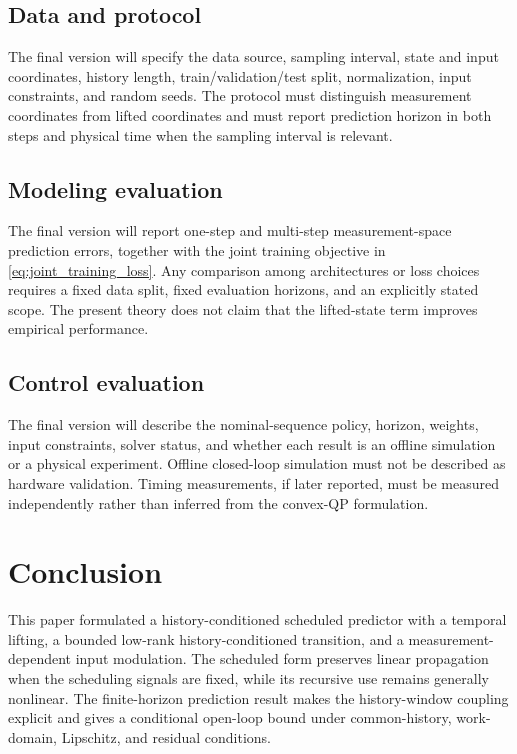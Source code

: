 \documentclass[journal]{IEEEtran}
\begin{document}
\subsection{Data and protocol}

The final version will specify the data source, sampling interval, state and input coordinates, history length, train/validation/test split, normalization, input constraints, and random seeds. The protocol must distinguish measurement coordinates from lifted coordinates and must report prediction horizon in both steps and physical time when the sampling interval is relevant.

\subsection{Modeling evaluation}

The final version will report one-step and multi-step measurement-space prediction errors, together with the joint training objective in \eqref{eq:joint_training_loss}. Any comparison among architectures or loss choices requires a fixed data split, fixed evaluation horizons, and an explicitly stated scope. The present theory does not claim that the lifted-state term improves empirical performance.

\subsection{Control evaluation}

The final version will describe the nominal-sequence policy, horizon, weights, input constraints, solver status, and whether each result is an offline simulation or a physical experiment. Offline closed-loop simulation must not be described as hardware validation. Timing measurements, if later reported, must be measured independently rather than inferred from the convex-QP formulation.

\section{Conclusion}
\label{sec:conclusion}

This paper formulated a history-conditioned scheduled predictor with a temporal lifting, a bounded low-rank history-conditioned transition, and a measurement-dependent input modulation. The scheduled form preserves linear propagation when the scheduling signals are fixed, while its recursive use remains generally nonlinear. The finite-horizon prediction result makes the history-window coupling explicit and gives a conditional open-loop bound under common-history, work-domain, Lipschitz, and residual conditions.
\end{document}

